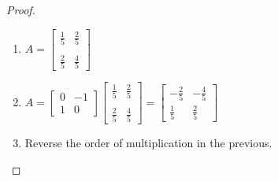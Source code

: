 \begin{exercise}
\begin{proof}
\begin{enumerate}
            \item \( A = \begin{bmatrix} \frac{1}{5} & \frac{2}{5} \\ & \\ \frac{2}{5} & \frac{4}{5} \end{bmatrix} \)
            
            \item \( A = \begin{bmatrix} 0 & -1 \\ 1 & 0 \end{bmatrix} \begin{bmatrix} \frac{1}{5} & \frac{2}{5} \\ & \\ \frac{2}{5} & \frac{4}{5} \end{bmatrix} = \begin{bmatrix} -\frac{2}{5} & -\frac{4}{5} \\ \frac{1}{5} & \frac{2}{5} \end{bmatrix} \)
            
            \item Reverse the order of multiplication in the previous.
        \end{enumerate}    
    \end{proof}
\end{exercise} %

\begin{exercise} \label{e1.4.6}

\end{exercise} %

